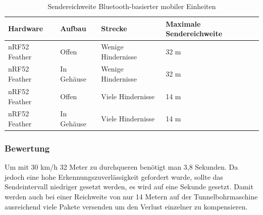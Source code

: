 \begin{table}[h]
	\centering
	\caption{Sendereichweite Bluetooth-basierter mobiler Einheiten}
	\label{table:rangeblue}
	\begin{tabular}{p{2.5cm}|l|l|p{3cm}}
		Hardware & Aufbau & Strecke & Maximale Sendereichweite \\
		\hline
		nRF52 Feather & Offen & Wenige Hindernisse & 32 m \\
		nRF52 Feather & In Gehäuse & Wenige Hindernisse & 32 m \\
		nRF52 Feather & Offen & Viele Hindernisse & 14 m \\
		nRF52 Feather & In Gehäuse & Viele Hindernisse & 14 m \\
	\end{tabular}
\end{table}

\subsubsection{Bewertung}
Um mit 30 km/h 32 Meter zu durchqueren benötigt man 3,8 Sekunden.
Da jedoch eine hohe Erkennungszuverlässigkeit gefordert wurde, sollte das Sendeintervall niedriger gesetzt werden, es wird auf eine Sekunde gesetzt.
Damit werden auch bei einer Reichweite von nur 14 Metern auf der Tunnelbohrmaschine ausreichend viele Pakete versenden um den Verlust einzelner zu kompensieren.

